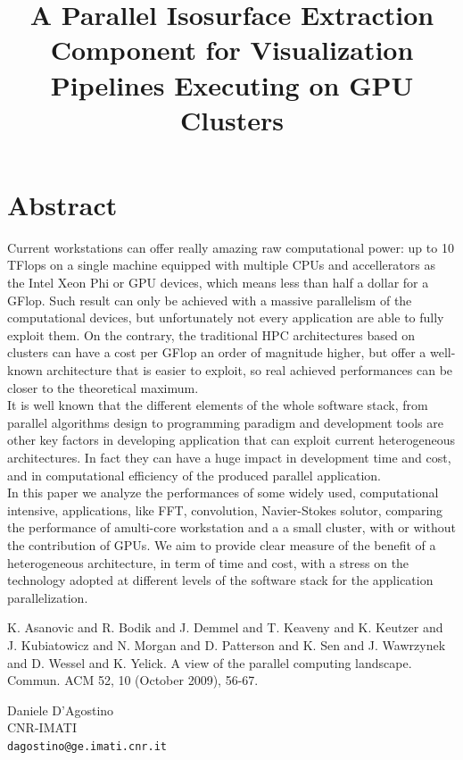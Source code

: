 \documentclass[article,A4,11pt]{llncs}%
\begin{document}
\section*{Abstract}
Current workstations can offer really amazing raw computational power: up to 10 TFlops on a single machine equipped with multiple CPUs and accellerators as the Intel Xeon Phi or GPU devices, which means less than half a dollar for a GFlop. 
Such result can only be achieved with a massive parallelism of the computational devices, but unfortunately not every application are able to fully exploit them. 
On the contrary, the traditional HPC architectures based on clusters can have a cost per GFlop an order of magnitude higher, but offer a well-known architecture that is easier to exploit, so real achieved performances can be closer to the theoretical maximum.\\
It is well known that the different elements of the whole software stack, from parallel algorithms design to programming paradigm and development tools are other key factors in developing application that can exploit current heterogeneous architectures. In fact they can have a huge impact in development time and cost, and in computational efficiency of the produced parallel application.\\
In this paper we analyze the performances of some widely used, computational intensive, applications, like FFT, convolution, Navier-Stokes solutor,  comparing the performance of amulti-core workstation and a  a small cluster, with or without the contribution of GPUs.
We aim to provide clear measure of the benefit of a heterogeneous architecture, in term of time and cost, with a stress on the technology adopted at different levels of the software stack for the application parallelization.



\begin{thebibliography}{10}
{\sc K. Asanovic and R. Bodik and J. Demmel and T. Keaveny and K. Keutzer and J. Kubiatowicz and N. Morgan and D. Patterson and K. Sen and J. Wawrzynek and D. Wessel and K. Yelick}. {A view of the parallel computing landscape}. Commun. ACM 52, 10 (October 2009), 56-67.
\end{thebibliography}

\title{A Parallel Isosurface Extraction Component for Visualization Pipelines Executing on GPU Clusters}
 \author{} \institute{}
\maketitle
\begin{center}
{\large Daniele D'Agostino}\\
CNR-IMATI\\
{\tt dagostino@ge.imati.cnr.it}
\end{center}
\end{document}
